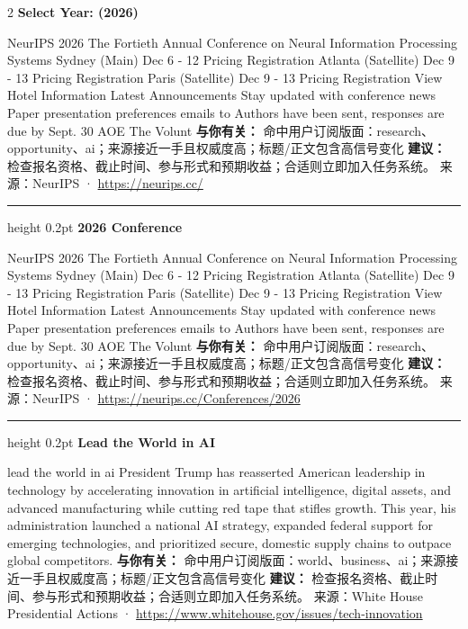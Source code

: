 \documentclass[10.5pt]{ctexart}
\begin{document}
\begin{multicols}{2}
{\large\bfseries Select Year: (2026)}\par
NeurIPS 2026 The Fortieth Annual Conference on Neural Information Processing Systems Sydney (Main) Dec 6 - 12 Pricing Registration Atlanta (Satellite) Dec 9 - 13 Pricing Registration Paris (Satellite) Dec 9 - 13 Pricing Registration View Hotel Information Latest Announcements Stay updated with conference news Paper presentation preferences emails to Authors have been sent, responses are due by Sept. 30 AOE The Volunt
\textbf{与你有关：} 命中用户订阅版面：research、opportunity、ai；来源接近一手且权威度高；标题/正文包含高信号变化
\textbf{建议：} 检查报名资格、截止时间、参与形式和预期收益；合适则立即加入任务系统。
{\footnotesize\color{ormuted} 来源：NeurIPS · \url{https://neurips.cc/}}
\vspace{2mm}
\hrule height 0.2pt
\vspace{2mm}
{\large\bfseries 2026 Conference}\par
NeurIPS 2026 The Fortieth Annual Conference on Neural Information Processing Systems Sydney (Main) Dec 6 - 12 Pricing Registration Atlanta (Satellite) Dec 9 - 13 Pricing Registration Paris (Satellite) Dec 9 - 13 Pricing Registration View Hotel Information Latest Announcements Stay updated with conference news Paper presentation preferences emails to Authors have been sent, responses are due by Sept. 30 AOE The Volunt
\textbf{与你有关：} 命中用户订阅版面：research、opportunity、ai；来源接近一手且权威度高；标题/正文包含高信号变化
\textbf{建议：} 检查报名资格、截止时间、参与形式和预期收益；合适则立即加入任务系统。
{\footnotesize\color{ormuted} 来源：NeurIPS · \url{https://neurips.cc/Conferences/2026}}
\vspace{2mm}
\hrule height 0.2pt
\vspace{2mm}
{\large\bfseries Lead the World in AI}\par
lead the world in ai President Trump has reasserted American leadership in technology by accelerating innovation in artificial intelligence, digital assets, and advanced manufacturing while cutting red tape that stifles growth. This year, his administration launched a national AI strategy, expanded federal support for emerging technologies, and prioritized secure, domestic supply chains to outpace global competitors.
\textbf{与你有关：} 命中用户订阅版面：world、business、ai；来源接近一手且权威度高；标题/正文包含高信号变化
\textbf{建议：} 检查报名资格、截止时间、参与形式和预期收益；合适则立即加入任务系统。
{\footnotesize\color{ormuted} 来源：White House Presidential Actions · \url{https://www.whitehouse.gov/issues/tech-innovation}}

\end{multicols}
\end{document}
